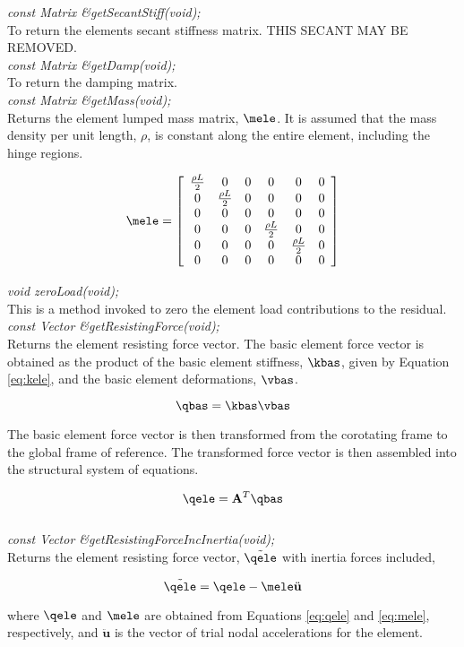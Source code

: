 {\em const Matrix \&getSecantStiff(void);} \\
To return the elements secant stiffness matrix. THIS SECANT MAY
BE REMOVED. \\

{\em const Matrix \&getDamp(void);} \\
To return the damping matrix. \\ 

{\em const Matrix \&getMass(void);} \\
Returns the element lumped mass matrix, $\mele$. It is assumed that the mass density per unit
length, $\rho$, is constant along the entire element, including the hinge regions.

\begin{equation}
\label{eq:mele}
\mele = \left[
   \begin{array}{c c c c c c}
      \frac{\rho L}{2} & 0 & 0 & 0 & 0 & 0 \\
      0 & \frac{\rho L}{2} & 0 & 0 & 0 & 0 \\
      0 & 0 & 0 & 0 & 0 & 0 \\
      0 & 0 & 0 & \frac{\rho L}{2} & 0 & 0 \\
      0 & 0 & 0 & 0 & \frac{\rho L}{2} & 0 \\
      0 & 0 & 0 & 0 & 0 & 0
   \end{array}
 \right]
\end{equation}

{\em void zeroLoad(void);}\\
This is a method invoked to zero the element load contributions to the residual. \\ 

{\em const Vector \&getResistingForce(void);} \\
Returns the element resisting force vector.  The basic element force vector is obtained as
the product of the basic element stiffness, $\kbas$, given by Equation \ref{eq:kele}, and the
basic element deformations, $\vbas$.

\begin{equation}
\qbas = \kbas \vbas
\end{equation}

The basic element force vector is then transformed from the corotating frame to the global frame
of reference.  The transformed force vector is then assembled into the structural system
of equations.

\begin{equation}
\label{eq:qele}
\qele = \mathbf{A}^T \qbas
\end{equation} \\

{\em const Vector \&getResistingForceIncInertia(void);} \\
Returns the element resisting force vector, $\tilde{\qele}$ with inertia forces included,

\begin{equation}
\tilde{\qele} = \qele - \mele \ddot{\mathbf u}
\end{equation}

where $\qele$ and $\mele$ are obtained from Equations \ref{eq:qele} and \ref{eq:mele}, respectively,
and $\ddot{\mathbf u}$ is the vector of trial nodal accelerations for the element. \\
